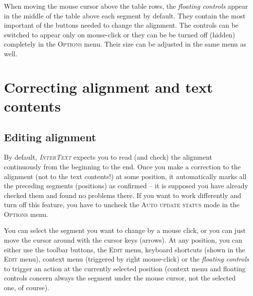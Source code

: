 \documentclass[a4paper,10pt,oneside]{book}
\newcommand{\IT}{\textit{\textsc{InterText}}\xspace}
\newcommand{\menu}[1]{\textsc{#1}}
\begin{document}
When moving the mouse cursor above the table rows, the \emph{floating controls} appear in the middle of the table above each segment by default. They contain the most important of the buttons needed to change the alignment. The controls can be switched to appear only on mouse-click or they can be be turned off (hidden) completely in the \menu{Options} menu. Their size can be adjusted in the same menu as well.

\chapter{Correcting alignment and text contents}\label{ch:howto:edit}

\section{Editing alignment}\label{ch:howto:edit_alignment}

By default, \IT expects you to read (and check) the alignment continuously from the beginning to the end. Once you make a correction to the alignment (not to the text contents!) at some position, it automatically marks all the preceding segments (positions) as confirmed -- it is supposed you have already checked them and found no problems there. If you want to work differently and turn off this feature, you have to uncheck the \menu{Auto update status} mode in the \menu{Options} menu.

You can select the segment you want to change by a mouse click, or you can just move the cursor around with the cursor keys (arrows). At any position, you can either use the toolbar buttons, the \menu{Edit} menu, keyboard shortcuts (shown in the \menu{Edit} menu), context menu (triggered by right mouse-click) or the \emph{floating controls} to trigger an action at the currently selected position (context menu and floating controls concern always the segment under the mouse cursor, not the selected one, of course).
\end{document}
